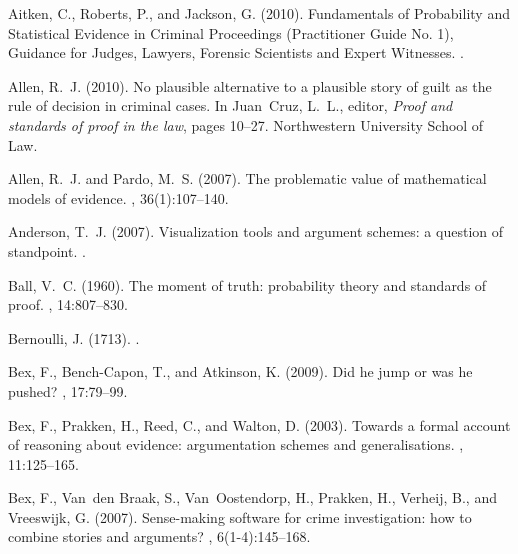 \documentclass[10pt,leqno]{article}
\begin{document}
\begin{thebibliography}{}

Aitken, C., Roberts, P., and Jackson, G. (2010).
\newblock Fundamentals of {P}robability and {S}tatistical {E}vidence in
  {C}riminal {P}roceedings ({P}ractitioner {G}uide {N}o. 1), {G}uidance for
  {J}udges, {L}awyers, {F}orensic {S}cientists and {E}xpert {W}itnesses.
.

Allen, R.~J. (2010).
\newblock No plausible alternative to a plausible story of guilt as the rule of
  decision in criminal cases.
\newblock In Juan~Cruz, L.~L., editor, {\em Proof and standards of proof in the
  law}, pages 10--27. Northwestern University School of Law.

Allen, R.~J. and Pardo, M.~S. (2007).
\newblock The problematic value of mathematical models of evidence.
, 36(1):107--140.

Anderson, T.~J. (2007).
\newblock Visualization tools and argument schemes: a question of standpoint.
.

Ball, V.~C. (1960).
\newblock The moment of truth: probability theory and standards of proof.
, 14:807--830.

Bernoulli, J. (1713).
.

Bex, F., Bench-Capon, T., and Atkinson, K. (2009).
\newblock Did he jump or was he pushed?
, 17:79--99.

Bex, F., Prakken, H., Reed, C., and Walton, D. (2003).
\newblock Towards a formal account of reasoning about evidence: argumentation
  schemes and generalisations.
, 11:125--165.

Bex, F., Van~den Braak, S., Van~Oostendorp, H., Prakken, H., Verheij, B., and
  Vreeswijk, G. (2007).
\newblock Sense-making software for crime investigation: how to combine stories
  and arguments?
, 6(1-4):145--168.


\end{thebibliography}
\end{document}
